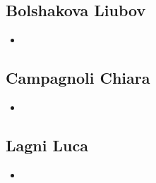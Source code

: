 \documentclass[a4paper,leqno]{article}
\begin{document}
\subsection{Bolshakova Liubov}
\begin{itemize}
	\item 
\end{itemize}
\subsection{Campagnoli Chiara}
\begin{itemize}
	\item 
\end{itemize}
\subsection{Lagni Luca}
\begin{itemize}
	\item 
\end{itemize}

	
\end{document}
